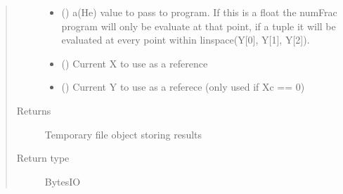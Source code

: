 \documentclass[letterpaper,10pt,english]{sphinxmanual}
\begin{document}
\begin{fulllineitems}
\begin{quote}
\begin{description}
\begin{itemize}
\item {} 
\sphinxAtStartPar
{} () \textendash{} a(He) value to pass to program. If this is a float the numFrac
program will only be evaluate at that point, if a tuple it will be
evaluated at every point within linspace(Y{[}0{]}, Y{[}1{]}, Y{[}2{]}).

\item {} 
\sphinxAtStartPar
{} () \textendash{} Current X to use as a reference

\item {} 
\sphinxAtStartPar
{} () \textendash{} Current Y to use as a referece (only used if Xc == 0)

\end{itemize}

\item[{Returns}] \leavevmode
\sphinxAtStartPar
{} \textendash{} Temporary file object storing results

\item[{Return type}] \leavevmode
\sphinxAtStartPar
BytesIO

\end{description}\end{quote}

\end{fulllineitems}

\end{document}
